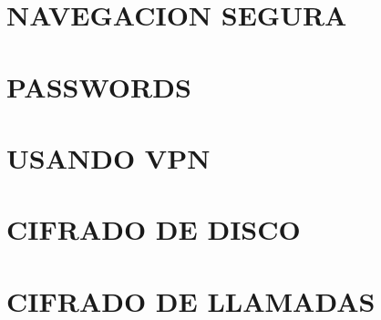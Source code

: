 \documentclass[oribibl,oneside,pdftext]{scrbook}
\begin{document}
\chapter{NAVEGACION SEGURA}
\clearpage

\clearpage

\clearpage

\clearpage

\clearpage

\clearpage

\clearpage

\graphicspath{{./capitulo_09_PASSWORDS/}}
\chapter{PASSWORDS}
\clearpage

\clearpage

\clearpage

\graphicspath{{./capitulo_10_USANDO_VPN/}}
\chapter{USANDO VPN}
\clearpage

\clearpage

\clearpage

\clearpage

\clearpage

\graphicspath{{./capitulo_11_CIFRADO_DE_DISCO/}}
\chapter{CIFRADO DE DISCO}
\clearpage

\clearpage

\clearpage

\clearpage

\graphicspath{{./capitulo_12_CIFRADO_DE_LLAMADAS/}}
\chapter{CIFRADO DE LLAMADAS}
\clearpage

\graphicspath{{./capitulo_13_CIFRADO_DE_MENSAJERIA_INSTANTANEA/}}
\end{document}
